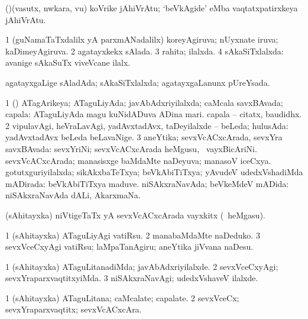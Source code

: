 \bentry 
{} 
\gl{\nA}
\expl{}
\bmng
(\ame)(vasutx, nwkara, \mo vu) koVrike jAhiVrAtu; `beVkAgide' eMba vaqtatxpatirxkeya jAhiVrAtu. 
\emng
\eentry

\bentry
{} 
\gl{\gu}
\expl{}
\bmng
\bnum
\num{1} (guNamaTaTxdalilx yA parxmANadalilx) koreyAgiruva; nUyxnate iruva; kaDimeyAgiruva. 
\num{2} agatayxkekx sAlada. 
\num{3} rahita; ilalxda. 
\num{4} sAkaSiTxlalxda:  avanige sAkaSuTx viveVcane ilalx. 
\enum
\emng

\noindent 
\gl{\pagu}
\expl{}
\bmng
{} agatayxgaLige sAladAda; sAkaSiTxlalxda; agatayxgaLanunx pUreYsada. 
\emng
\eentry

\bentry 
{} 
\gl{\gu}
\expl{}
\bmng
\bnum
\num{1} (\pArxparx) ATagArikeya; ATaguLiyAda; javAbAdxriyilalxda; caMcala savxBAvada; capala:  ATaguLiyAda magu  kuNidADuva ADina mari.  capala -- citatx, baudidhx. 
\num{2} vipulavAgi, heVraLavAgi, yadAvxtadAvx, taDeyilalxde -- beLeda; hulusAda:  yadAvxtadAvx beLeda beLavaNige. 
\num{3} aneYtika; sevxVcACxcArada, sevxYra savxBAvada:  sevxYriNi; sevxVcACxcArada heMgusu, \kanmu\ vayxBicAriNi. 
\banum
{} sevxVcACxcArada; manasisxge baMdaMte naDeyuva; manasoV iceCxya. 
 gotutxguriyilalxda; sikAkxbaTeTxya; beVkAbiTiTxya; yAvudeV udedxVshadiMda mADirada:  beVkAbiTiTxya maduve. 
 niSAkxraNavAda; beVkeMdeV mADida:  niSAkxraNavAda dALi, AkarxmaNa. 
\eanum
\numie
\enum
\emng
\eentry

\bentry 
{} 
\gl{\nA}
\expl{}
\bmng
(sAhitayxka) niVtigeTaTx yA sevxVcACxcArada vayxkitx (\kanmu\ heMgasu). 
\emng
\eentry

\bentry 
{} 
\gl{\akirx}
\expl{}
\bmng
\bnum
\num{1} (sAhitayxka) ATaguLiyAgi vatiRsu. 
\num{2} manabaMdaMte naDeduko. 
\num{3} sevxVceCxyAgi vatiRsu; laMpaTanAgiru; aneYtika jiVvana naDesu. 
\enum
\emng
\eentry

\bentry
{} 
\gl{\kirxvi}
\expl{}
\bmng
\bnum
\num{1} (sAhitayxka) ATaguLitanadiMda; javAbAdxriyilalxde. 
\num{2} sevxVceCxyAgi; sevxYraparxvaqtitxyiMda. 
\num{3} niSAkxraNavAgi; udedxVshaveV ilalxde. 
\enum
\emng
\eentry

\bentry
{} 
\gl{\nA}
\expl{}
\bmng
\bnum
\num{1} (sAhitayxka) ATaguLitana; caMcalate; capalate. 
\num{2} sevxVceCx; sevxYraparxvaqtitx; sevxVcACxcAra. 
\enum
\emng
\eentry


